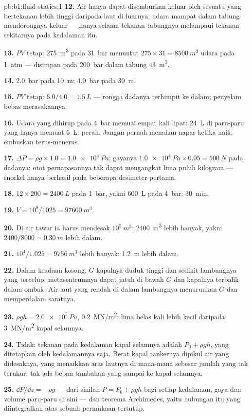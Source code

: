 \begin{solution}{pb:b1:fluid-statics:1}
\textbf{12.} Air hanya dapat disemburkan keluar oleh sesuatu yang bertekanan lebih tinggi
daripada laut di luarnya; udara mampat dalam tabung mendorongnya keluar --- hanya
selama tekanan tabungnya melampaui tekanan sekitarnya pada kedalaman
itu.

\textbf{13.} $PV$ tetap: \qty{275}{m^3} pada \qty{31}{bar} menuntut $275 \times 31
= \qty{8500}{m^3}$ udara pada \qty{1}{atm} --- disimpan pada \qty{200}{bar} dalam
tabung \qty{43}{m^3}.

\textbf{14.} \qty{2.0}{bar} pada \qty{10}{m}; \qty{4.0}{bar} pada \qty{30}{m}.

\textbf{15.} $PV$ tetap: $6.0/4.0 = \qty{1.5}{L}$ --- rongga dadanya
terhimpit ke dalam; penyelam bebas merasakannya.

\textbf{16.} Udara yang dihirup pada \qty{4}{bar} memuai empat kali lipat: \qty{24}{L} di paru-paru
yang hanya memuat \qty{6}{L}: pecah. Jangan pernah menahan napas ketika naik; embuskan
terus-menerus.

\textbf{17.} $\Delta P = \rho g \times 1.0 = \qty{1.0e4}{Pa}$; gayanya $\qty{1.0e4}{Pa}
\times 0.05 = \qty{500}{N}$ pada dadanya: otot pernapasannya tak dapat
mengangkat lima puluh kilogram --- snorkel hanya berhasil pada beberapa desimeter pertama.

\textbf{18.} $12 \times 200 = \qty{2400}{L}$ pada \qty{1}{bar}, yakni \qty{600}{L}
pada \qty{4}{bar}: \qty{30}{min}.

\textbf{19.} $V = 10^8/1025 = \qty{97600}{m^3}$.

\textbf{20.} Di air tawar ia harus mendesak $10^5\ \unit{m^3}$: \qty{2400}{m^3}
lebih banyak, yakni $2400/8000 = \qty{0.30}{m}$ lebih dalam.

\textbf{21.} $10^4/1.025 = \qty{9756}{m^3}$ lebih banyak: \qty{1.2}{m} lebih dalam.

\textbf{22.} Dalam keadaan kosong, $G$ kapalnya duduk tinggi dan sedikit lambungnya yang tercelup:
metasentrumnya dapat jatuh di bawah $G$ dan kapalnya terbalik dalam ombak. Air
laut yang rendah di dalam lambungnya menurunkan $G$ dan memperdalam saratnya.

\textbf{23.} $\rho gh = \qty{2.0e5}{Pa}$, \qty{0.2}{MN/m^2}: lima belas kali lebih kecil
daripada \qty{3}{MN/m^2} kapal selamnya.

\textbf{24.} Tidak: tekanan pada kedalaman kapal selamnya adalah $P_0 + \rho gh$,
yang ditetapkan oleh kedalamannya saja. Berat kapal tankernya dipikul air yang
didesaknya, yang menaikkan aras lautnya di mana-mana sebesar jumlah yang tak
terukur; tak ada beban tambahan yang sampai ke kapal selamnya.

\textbf{25.} $\dd P/\dd z = -\rho g$ --- dari sinilah $P = P_0 + \rho gh$ bagi setiap
kedalaman, gaya dan volume paru-paru di sini --- dan teorema Archimedes, yaitu
hubungan itu yang diintegralkan atas sebuah permukaan tertutup.
\end{solution}
